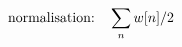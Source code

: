 \documentclass[preview]{standalone}
\begin{document}
\begin{align*}
\special{dvisvgm:raw <g id='unique000'>}\text{normalisation:}\quad \sum_n w[n]/2\special{dvisvgm:raw </g>}
\end{align*}
\end{document}
